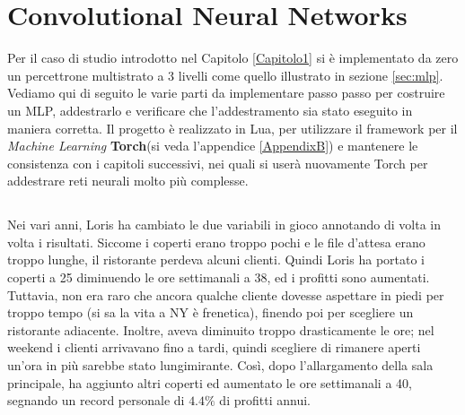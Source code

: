 \chapter{Convolutional Neural Networks} %
\label{Chapter2} %
\def \path {Figures/C2}
\def \teoria {Figures/teoria}
Per il caso di studio introdotto nel Capitolo \ref{Capitolo1} si è implementato da zero un percettrone multistrato a 3 livelli come quello illustrato in sezione \ref{sec:mlp}. Vediamo qui di seguito le varie parti da implementare passo passo per costruire un MLP, addestrarlo e verificare che l'addestramento sia stato eseguito in maniera corretta. Il progetto è realizzato in Lua, per utilizzare il framework per il \emph{Machine Learning} \textbf{Torch}(si veda l'appendice \ref{AppendixB}) e mantenere le consistenza con i capitoli successivi, nei quali si userà nuovamente Torch per addestrare reti neurali molto più complesse.

\section{}
Nei vari anni, Loris ha cambiato le due variabili in gioco annotando di volta in volta i risultati. Siccome i coperti erano troppo pochi e le file d'attesa erano troppo lunghe, il ristorante perdeva alcuni clienti. Quindi Loris ha portato i coperti a 25 diminuendo le ore settimanali a 38, ed i profitti sono aumentati. Tuttavia, non era raro che ancora qualche cliente dovesse aspettare in piedi per troppo tempo (si sa la vita a NY è frenetica), finendo poi per scegliere un ristorante adiacente. Inoltre, aveva diminuito troppo drasticamente le ore; nel weekend i clienti arrivavano fino a tardi, quindi scegliere di rimanere aperti un'ora in più sarebbe stato lungimirante. Così, dopo l'allargamento della sala principale, ha aggiunto altri coperti ed aumentato le ore settimanali a 40, segnando un record personale di $4.4\%$ di profitti annui. \\

